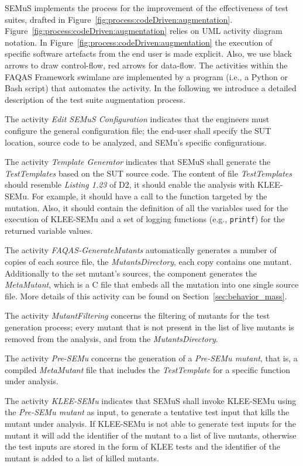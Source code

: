 SEMuS implements the process for the improvement of the effectiveness of test suites, drafted in Figure~\ref{fig:process:codeDriven:augmentation}. Figure~\ref{fig:process:codeDriven:augmentation} relies on UML activity diagram notation. 
In Figure~\ref{fig:process:codeDriven:augmentation} the execution of specific software artefacts from the end user is made explicit. Also, we use black arrows to draw control-flow, red arrows for data-flow. The activities within the FAQAS Framework swimlane are implemented by a program (i.e., a Python or Bash script) that automates the activity. In the following we introduce a detailed description of the test suite augmentation process.

The activity \emph{Edit SEMuS Configuration} indicates that the engineers must configure the general configuration file; the end-user shall specify the SUT location, source code to be analyzed, and SEMu's specific configurations.

The activity \emph{Template Generator} indicates that SEMuS shall generate the \emph{TestTemplates} based on the SUT source code.
The content of file \emph{TestTemplates} should resemble \emph{Listing 1.23} of D2, it should enable the analysis with KLEE-SEMu. For example, it should have a call to the function targeted by the mutation. Also, it should contain the definition of all the variables used for the execution of KLEE-SEMu and a set of logging functions (e.g., \texttt{printf}) for the returned variable values.

The activity \emph{FAQAS-GenerateMutants} automatically generates a number of copies of each source file, the \emph{MutantsDirectory}, each copy contains one mutant. Additionally to the set mutant's sources, the component generates the \emph{MetaMutant}, which is a C file that embeds all the mutation into one single source file. More details of this activity can be found on Section~\ref{sec:behavior_mass}. 

The activity \emph{MutantFiltering} concerns the filtering of mutants for the test generation process; every mutant that is not present in the list of live mutants is removed from the analysis, and from the \emph{MutantsDirectory}. 

The activity \emph{Pre-SEMu} concerns the generation of a \emph{Pre-SEMu mutant}, that is, a compiled \emph{MetaMutant} file that includes the \emph{TestTemplate} for a specific function under analysis.

The activity \emph{KLEE-SEMu} indicates that SEMuS shall invoke KLEE-SEMu using the \emph{Pre-SEMu mutant} as input, to generate a tentative test input that kills the mutant under analysis. If KLEE-SEMu is not able to generate test inputs for the mutant it will add the identifier of the mutant to a list of live mutants, otherwise the test inputs are stored in the form of KLEE tests and the identifier of the mutant is added to a list of killed mutants.

